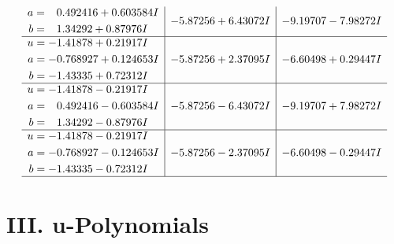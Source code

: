 \documentclass[1p]{elsarticle_modified}
\theoremstyle{definition}
\begin{document}
$$\begin{array}{c|c|c}
\begin{aligned}
a &= \phantom{-}0.492416 + 0.603584 I \\
b &= \phantom{-}1.34292 + 0.87976 I\end{aligned}
 & -5.87256 + 6.43072 I & -9.19707 - 7.98272 I \\ \hline\begin{aligned}
u &= -1.41878 + 0.21917 I \\
a &= -0.768927 + 0.124653 I \\
b &= -1.43335 + 0.72312 I\end{aligned}
 & -5.87256 + 2.37095 I & -6.60498 + 0.29447 I \\ \hline\begin{aligned}
u &= -1.41878 - 0.21917 I \\
a &= \phantom{-}0.492416 - 0.603584 I \\
b &= \phantom{-}1.34292 - 0.87976 I\end{aligned}
 & -5.87256 - 6.43072 I & -9.19707 + 7.98272 I \\ \hline\begin{aligned}
u &= -1.41878 - 0.21917 I \\
a &= -0.768927 - 0.124653 I \\
b &= -1.43335 - 0.72312 I\end{aligned}
 & -5.87256 - 2.37095 I & -6.60498 - 0.29447 I\\
 \hline 
 \end{array}$$\newpage
\newpage\renewcommand{\arraystretch}{1}
\centering \section*{ III. u-Polynomials}
\end{document}
